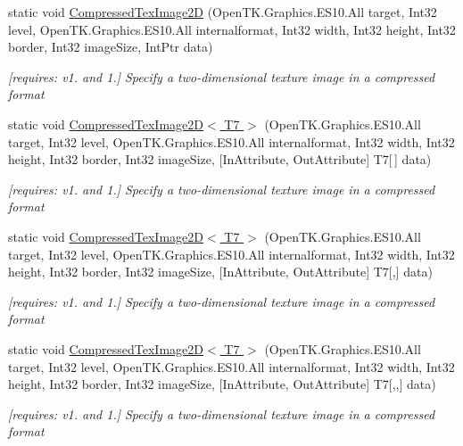 \begin{DoxyCompactItemize}
static void \hyperlink{class_open_t_k_1_1_graphics_1_1_e_s10_1_1_g_l_a8f8fc5fbdf1e4ea8859f9f76dfc234ad}{Compressed\-Tex\-Image2\-D} (Open\-T\-K.\-Graphics.\-E\-S10.\-All target, Int32 level, Open\-T\-K.\-Graphics.\-E\-S10.\-All internalformat, Int32 width, Int32 height, Int32 border, Int32 image\-Size, Int\-Ptr data)
\begin{DoxyCompactList}\small\item\em \mbox{[}requires\-: v1. and 1.\mbox{]} Specify a two-\/dimensional texture image in a compressed format \end{DoxyCompactList}\item 
static void \hyperlink{class_open_t_k_1_1_graphics_1_1_e_s10_1_1_g_l_aa73463933008efe5a295040d9f311bd6}{Compressed\-Tex\-Image2\-D$<$ T7 $>$} (Open\-T\-K.\-Graphics.\-E\-S10.\-All target, Int32 level, Open\-T\-K.\-Graphics.\-E\-S10.\-All internalformat, Int32 width, Int32 height, Int32 border, Int32 image\-Size, \mbox{[}In\-Attribute, Out\-Attribute\mbox{]} T7\mbox{[}$\,$\mbox{]} data)
\begin{DoxyCompactList}\small\item\em \mbox{[}requires\-: v1. and 1.\mbox{]} Specify a two-\/dimensional texture image in a compressed format \end{DoxyCompactList}\item 
static void \hyperlink{class_open_t_k_1_1_graphics_1_1_e_s10_1_1_g_l_a410379bfd5d54c8f18a7ce539a6a9959}{Compressed\-Tex\-Image2\-D$<$ T7 $>$} (Open\-T\-K.\-Graphics.\-E\-S10.\-All target, Int32 level, Open\-T\-K.\-Graphics.\-E\-S10.\-All internalformat, Int32 width, Int32 height, Int32 border, Int32 image\-Size, \mbox{[}In\-Attribute, Out\-Attribute\mbox{]} T7\mbox{[},\mbox{]} data)
\begin{DoxyCompactList}\small\item\em \mbox{[}requires\-: v1. and 1.\mbox{]} Specify a two-\/dimensional texture image in a compressed format \end{DoxyCompactList}\item 
static void \hyperlink{class_open_t_k_1_1_graphics_1_1_e_s10_1_1_g_l_a5a8e94cfb35ef553fde27535124682f7}{Compressed\-Tex\-Image2\-D$<$ T7 $>$} (Open\-T\-K.\-Graphics.\-E\-S10.\-All target, Int32 level, Open\-T\-K.\-Graphics.\-E\-S10.\-All internalformat, Int32 width, Int32 height, Int32 border, Int32 image\-Size, \mbox{[}In\-Attribute, Out\-Attribute\mbox{]} T7\mbox{[},,\mbox{]} data)
\begin{DoxyCompactList}\small\item\em \mbox{[}requires\-: v1. and 1.\mbox{]} Specify a two-\/dimensional texture image in a compressed format \end{DoxyCompactList}\item 

\end{DoxyCompactItemize}
